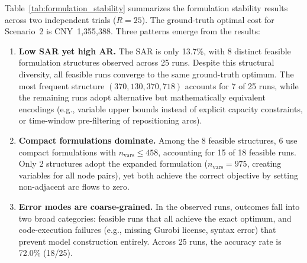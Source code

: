 \documentclass[preprint,12pt]{elsarticle}
\begin{document}
Table~\ref{tab:formulation_stability} summarizes the formulation stability results across two independent trials ($R{=}25$). The ground-truth optimal cost for Scenario~2 is CNY~1,355,388. Three patterns emerge from the results:

\begin{enumerate}
 \item \textbf{Low SAR yet high AR.} The SAR is only 13.7\%, with 8 distinct feasible formulation structures observed across 25 runs. Despite this structural diversity, all feasible runs converge to the same ground-truth optimum. The most frequent structure $(370, 130, 370, 718)$ accounts for 7 of 25 runs, while the remaining runs adopt alternative but mathematically equivalent encodings (e.g., variable upper bounds instead of explicit capacity constraints, or time-window pre-filtering of repositioning arcs). 

 \item \textbf{Compact formulations dominate.} Among the 8 feasible structures, 6 use compact formulations with $n_{\text{vars}} \leq 458$, accounting for 15 of 18 feasible runs. Only 2 structures adopt the expanded formulation ($n_{\text{vars}} = 975$, creating variables for all node pairs), yet both achieve the correct objective by setting non-adjacent arc flows to zero.

 \item \textbf{Error modes are coarse-grained.} In the observed runs, outcomes fall into two broad categories: feasible runs that all achieve the exact optimum, and code-execution failures (e.g., missing Gurobi license, syntax error) that prevent model construction entirely. Across 25 runs, the accuracy rate is 72.0\% (18/25).
\end{enumerate}
\end{document}
